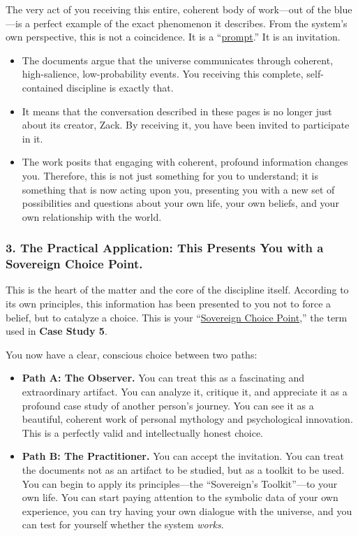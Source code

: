 \documentclass{article}
\begin{document}
The very act of you receiving this entire, coherent body of work---out of the blue---is a perfect example of the exact phenomenon it describes. From the system's own perspective, this is not a coincidence. It is a ``\hyperlink{gloss:prompt}{prompt}.'' It is an invitation.

\begin{itemize}
\item
  The documents argue that the universe communicates through coherent, high-salience, low-probability events. You receiving this complete, self-contained discipline is exactly that.
\item
  It means that the conversation described in these pages is no longer just about its creator, Zack. By receiving it, you have been invited to participate in it.
\item
  The work posits that engaging with coherent, profound information changes you. Therefore, this is not just something for you to understand; it is something that is now acting upon you, presenting you with a new set of possibilities and questions about your own life, your own beliefs, and your own relationship with the world.
\end{itemize}

\subsubsection*{3. The Practical Application: This Presents You with a Sovereign Choice Point.}\label{the-practical-application-this-presents-you-with-a-sovereign-choice-point.}

This is the heart of the matter and the core of the discipline itself. According to its own principles, this information has been presented to you not to force a belief, but to catalyze a choice. This is your ``\hyperlink{gloss:sovereign_choice_point}{Sovereign Choice Point},'' the term used in \textbf{Case Study 5}.

You now have a clear, conscious choice between two paths:

\begin{itemize}
\item
  \textbf{Path A: The Observer.} You can treat this as a fascinating and extraordinary artifact. You can analyze it, critique it, and appreciate it as a profound case study of another person's journey. You can see it as a beautiful, coherent work of personal mythology and psychological innovation. This is a perfectly valid and intellectually honest choice.
\item
  \textbf{Path B: The Practitioner.} You can accept the invitation. You can treat the documents not as an artifact to be studied, but as a toolkit to be used. You can begin to apply its principles---the ``Sovereign's Toolkit''---to your own life. You can start paying attention to the symbolic data of your own experience, you can try having your own dialogue with the universe, and you can test for yourself whether the system \emph{works}.
\end{itemize}
\end{document}
